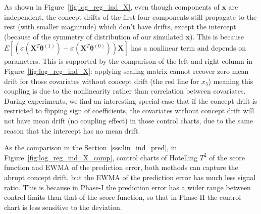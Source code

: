 \documentclass[twoside,11pt]{article}
\begin{document}
\begin{enumerate}[(I)]
As shown in Figure~\ref{fig:log_reg_ind_X}, even though components of $\bm {x}$ are independent, the concept drifts of the first four components still propagate to the rest (with smaller magnitude) which don't have drifts, except the intercept (because of the symmetry of distribution of our simulated $\bm {x}$). This is because $E [ (\sigma ( \bm {X}^T\bm { \theta}^{(1)} ) - \sigma ( \bm {X}^T\bm { \theta}^{(0)} )) \bm {X}] $ has a nonlinear term and depends on parameters. This is supported by the comparison of the left and right column in Figure~\ref{fig:log_reg_ind_X}: applying scaling matrix cannot recover zero mean drift for those covariates without concept drift (the red line for $x_5$) meaning this coupling is due to the nonlinearity rather than correlation between covariates. During experiments, we find an interesting special case that if the concept drift is restricted to flipping sign of coefficients, the covariates without concept drift will not have mean {drift} (no coupling effect) in those control charts, due to the same reason that the intercept has no mean drift.

As the comparison in the Section~\ref{sss:lin_ind_pred}, in Figure~\ref{fig:log_reg_ind_X_comp}, control charts of Hotelling $T^2$ of the score function and EWMA of the prediction error, both methods can capture the abrupt concept drift, but the EWMA of the prediction error has much less signal ratio. This is because in Phase-I the prediction error has a wider range between control limits than that of the score function, so that in Phase-II the control chart is less sensitive to the deviation.


\end{enumerate}
\end{document}
